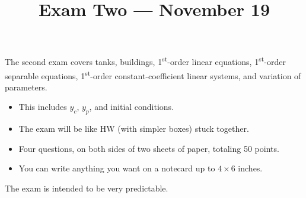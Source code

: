 \documentclass[11pt,aspectratio=169]{beamer}
\title{Exam Two --- November 19}
\date{}
\begin{document}
\begin{frame}{\inserttitle}
The second exam covers tanks, buildings, 1\textsuperscript{st}-order linear equations, 1\textsuperscript{st}-order separable equations, 1\textsuperscript{st}-order constant-coefficient linear systems, and variation of parameters.
  \begin{itemize}
  	\item This includes $y_c$, $y_p$, and initial conditions.
  	\item The exam will be like HW (with simpler boxes) stuck together.
  	\item Four questions, on both sides of two sheets of paper, totaling 50 points.
  	\item You can write anything you want on a notecard up to $4\times6$ inches. 

  \end{itemize}

The exam is intended to be very predictable.
\end{frame}
\end{document}
